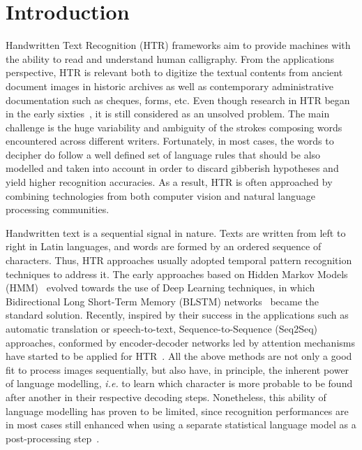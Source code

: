 \documentclass[10pt,twocolumn,letterpaper]{article}
\begin{document}
\maketitle



\section{Introduction}

Handwritten Text Recognition (HTR) frameworks aim to provide machines with the ability to read and understand human calligraphy. From the applications perspective, HTR is relevant both to digitize the textual contents from ancient document images in historic archives as well as contemporary administrative documentation such as cheques, forms, etc. Even though research in HTR began in the early sixties~\cite{mermelstein1964system}, it is still considered as an unsolved problem. The main challenge is the huge variability and ambiguity of the strokes composing words encountered across different writers. Fortunately, in most cases, the words to decipher do follow a well defined set of language rules that should be also modelled and taken into account in order to discard gibberish hypotheses and yield higher recognition accuracies. As a result, HTR is often approached by combining technologies from both computer vision and natural language processing communities.

Handwritten text is a sequential signal in nature. Texts are written from left to right in Latin languages, and words are formed by an ordered sequence of characters. Thus, HTR approaches usually adopted temporal pattern recognition techniques to address it. The early approaches based on Hidden Markov Models (HMM)~\cite{bianne2011dynamic} evolved towards the use of Deep Learning techniques, in which Bidirectional Long Short-Term Memory (BLSTM) networks~\cite{graves2008novel} became the standard solution. Recently, inspired by their success in the applications such as automatic translation  or speech-to-text, Sequence-to-Sequence (Seq2Seq) approaches, conformed by  encoder-decoder networks led by attention mechanisms have started to be applied for HTR~\cite{michael2019evaluating}. All the above methods are not only a good fit to process images sequentially, but also have, in principle, the inherent power of language modelling, \emph{i.e.} to learn which character is more probable to be found after another in their respective decoding steps. Nonetheless, this ability of language modelling has proven to be limited, since recognition performances are in most cases still enhanced when using a separate statistical language model as a post-processing step~\cite{tensmeyer2018language}.
\end{document}
